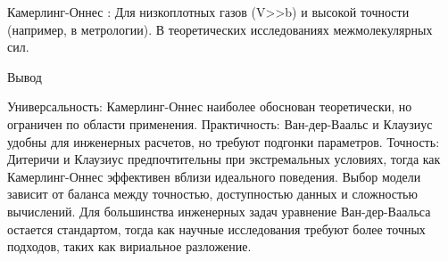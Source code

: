 \documentclass[12pt]{article}
\begin{document}
Камерлинг-Оннес :
Для низкоплотных газов (V>>b) и высокой точности (например, в метрологии).
В теоретических исследованиях межмолекулярных сил.


Вывод

Универсальность: Камерлинг-Оннес наиболее обоснован теоретически, но ограничен по области применения.
Практичность: Ван-дер-Ваальс и Клаузиус удобны для инженерных расчетов, но требуют подгонки параметров.
Точность: Дитеричи и Клаузиус предпочтительны при экстремальных условиях, тогда как Камерлинг-Оннес эффективен вблизи идеального поведения.
Выбор модели зависит от баланса между точностью, доступностью данных и сложностью вычислений. Для большинства инженерных задач уравнение Ван-дер-Ваальса остается стандартом, тогда как научные исследования требуют более точных подходов, таких как вириальное разложение.
\end{document}
